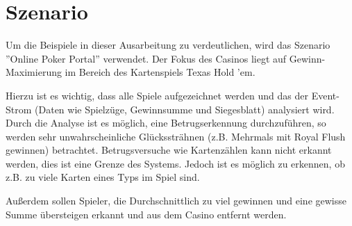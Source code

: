 \chapter{Szenario}
Um die Beispiele in dieser Ausarbeitung zu verdeutlichen, wird das Szenario ''Online Poker Portal'' verwendet. Der Fokus des Casinos liegt auf Gewinn-Maximierung im Bereich des Kartenspiels Texas Hold 'em.

Hierzu ist es wichtig, dass alle Spiele aufgezeichnet werden und das der Event-Strom (Daten wie Spielzüge, Gewinnsumme und Siegesblatt) analysiert wird. 
Durch die Analyse ist es möglich, eine Betrugserkennung durchzuführen, so werden sehr unwahrscheinliche Glückssträhnen (z.B. Mehrmals mit Royal Flush gewinnen) betrachtet.
Betrugsversuche wie Kartenzählen kann nicht erkannt werden, dies ist eine Grenze des Systems. Jedoch ist es möglich zu erkennen, ob z.B. zu viele Karten eines Typs im Spiel sind.

Außerdem sollen Spieler, die Durchschnittlich zu viel gewinnen und eine gewisse Summe übersteigen erkannt und aus dem Casino entfernt werden.